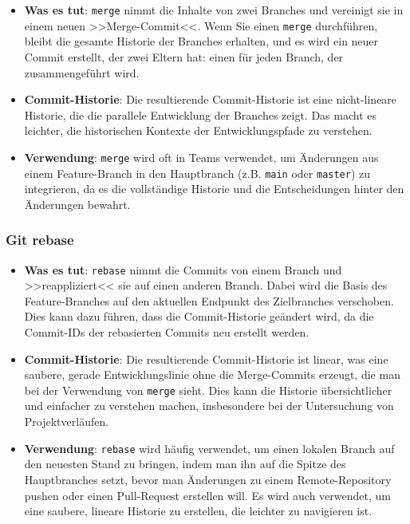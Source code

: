 \documentclass{vorlage-design-main}
\begin{document}
\begin{itemize}

\item
  \textbf{Was es tut}: \verb|merge| nimmt die Inhalte
  von zwei Branches und vereinigt sie in einem neuen >>Merge-Commit<<.
  Wenn Sie einen \verb|merge| durchführen, bleibt die
  gesamte Historie der Branches erhalten, und es wird ein neuer Commit
  erstellt, der zwei Eltern hat: einen für jeden Branch, der
  zusammengeführt wird.
\item
  \textbf{Commit-Historie}: Die resultierende Commit-Historie ist eine
  nicht-lineare Historie, die die parallele Entwicklung der Branches
  zeigt. Das macht es leichter, die historischen Kontexte der
  Entwicklungspfade zu verstehen.
\item
  \textbf{Verwendung}: \verb|merge| wird oft in Teams
  verwendet, um Änderungen aus einem Feature-Branch in den Hauptbranch
  (z.B. \verb|main| oder
  \verb|master|) zu integrieren, da es die
  vollständige Historie und die Entscheidungen hinter den Änderungen
  bewahrt.
\end{itemize}

\hypertarget{git-rebase}{%
\subsubsection{Git rebase}\label{git-rebase}}

\begin{itemize}

\item
  \textbf{Was es tut}: \verb|rebase| nimmt die
  Commits von einem Branch und >>reappliziert<< sie auf einen anderen
  Branch. Dabei wird die Basis des Feature-Branches auf den aktuellen
  Endpunkt des Zielbranches verschoben. Dies kann dazu führen, dass die
  Commit-Historie geändert wird, da die Commit-IDs der rebasierten
  Commits neu erstellt werden.
\item
  \textbf{Commit-Historie}: Die resultierende Commit-Historie ist
  linear, was eine saubere, gerade Entwicklungslinie ohne die
  Merge-Commits erzeugt, die man bei der Verwendung von
  \verb|merge| sieht. Dies kann die Historie
  übersichtlicher und einfacher zu verstehen machen, insbesondere bei
  der Untersuchung von Projektverläufen.
\item
  \textbf{Verwendung}: \verb|rebase| wird häufig
  verwendet, um einen lokalen Branch auf den neuesten Stand zu bringen,
  indem man ihn auf die Spitze des Hauptbranches setzt, bevor man
  Änderungen zu einem Remote-Repository pushen oder einen Pull-Request
  erstellen will. Es wird auch verwendet, um eine saubere, lineare
  Historie zu erstellen, die leichter zu navigieren ist.
\end{itemize}
\end{document}
